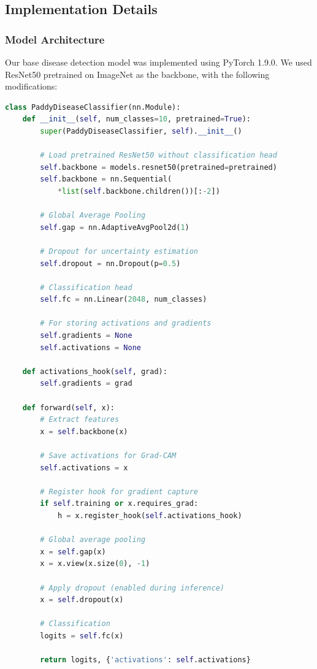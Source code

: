 \subsection{Implementation Details}

\subsubsection{Model Architecture}

Our base disease detection model was implemented using PyTorch 1.9.0. We used ResNet50 pretrained on ImageNet as the backbone, with the following modifications:

\begin{lstlisting}[language=Python, caption=Modified ResNet50 for explainability, label=lst:resnet-model, basicstyle=\footnotesize\ttfamily, breaklines=true]
class PaddyDiseaseClassifier(nn.Module):
    def __init__(self, num_classes=10, pretrained=True):
        super(PaddyDiseaseClassifier, self).__init__()
        
        # Load pretrained ResNet50 without classification head
        self.backbone = models.resnet50(pretrained=pretrained)
        self.backbone = nn.Sequential(
            *list(self.backbone.children())[:-2])
        
        # Global Average Pooling
        self.gap = nn.AdaptiveAvgPool2d(1)
        
        # Dropout for uncertainty estimation
        self.dropout = nn.Dropout(p=0.5)
        
        # Classification head
        self.fc = nn.Linear(2048, num_classes)
        
        # For storing activations and gradients
        self.gradients = None
        self.activations = None
    
    def activations_hook(self, grad):
        self.gradients = grad
    
    def forward(self, x):
        # Extract features
        x = self.backbone(x)
        
        # Save activations for Grad-CAM
        self.activations = x
        
        # Register hook for gradient capture
        if self.training or x.requires_grad:
            h = x.register_hook(self.activations_hook)
        
        # Global average pooling
        x = self.gap(x)
        x = x.view(x.size(0), -1)
        
        # Apply dropout (enabled during inference)
        x = self.dropout(x)
        
        # Classification
        logits = self.fc(x)
        
        return logits, {'activations': self.activations}
\end{lstlisting}

